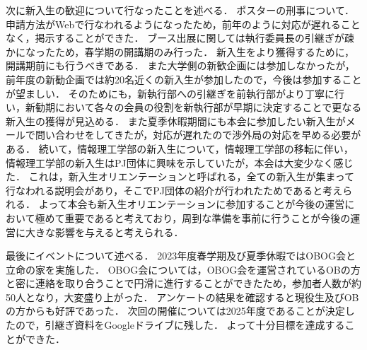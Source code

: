 次に新入生の歓迎について行なったことを述べる．
ポスターの刑事について．申請方法がWebで行なわれるようになったため，前年のように対応が遅れることなく，掲示することができた．
ブース出展に関しては執行委員長の引継ぎが疎かになったため，春学期の開講期のみ行った．
新入生をより獲得するために，開講期前にも行うべきである．
また大学側の新歓企画には参加しなかったが，前年度の新勧企画では約20名近くの新入生が参加したので，今後は参加することが望ましい．
そのためにも，新執行部への引継ぎを前執行部がより丁寧に行い，新勧期において各々の会員の役割を新執行部が早期に決定することで更なる新入生の獲得が見込める．
また夏季休暇期間にも本会に参加したい新入生がメールで問い合わせをしてきたが，対応が遅れたので渉外局の対応を早める必要がある．
続いて，情報理工学部の新入生について，情報理工学部の移転に伴い，情報理工学部の新入生はPJ団体に興味を示していたが，本会は大変少なく感じた．
これは，新入生オリエンテーションと呼ばれる，全ての新入生が集まって行なわれる説明会があり，そこでPJ団体の紹介が行われたためであると考えられる．
よって本会も新入生オリエンテーションに参加することが今後の運営において極めて重要であると考えており，周到な準備を事前に行うことが今後の運営に大きな影響を与えると考えられる．

最後にイベントについて述べる．
2023年度春学期及び夏季休暇ではOBOG会と立命の家を実施した．
OBOG会については，OBOG会を運営されているOBの方と密に連絡を取り合うことで円滑に進行することができたため，参加者人数が約50人となり，大変盛り上がった．
アンケートの結果を確認すると現役生及びOBの方からも好評であった．
次回の開催については2025年度であることが決定したので，引継ぎ資料をGoogleドライブに残した．
よって十分目標を達成することができた．